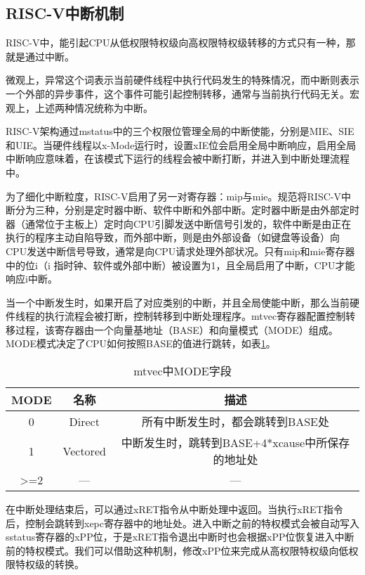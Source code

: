 \subsection{RISC-V中断机制}
\label{sec:interrupt}

RISC-V中，能引起CPU从低权限特权级向高权限特权级转移的方式只有一种，那就是通过中断。

微观上，异常这个词表示当前硬件线程中执行代码发生的特殊情况，而中断则表示一个外部的异步事件，这个事件可能引起控制转移，通常与当前执行代码无关。宏观上，上述两种情况统称为中断。

RISC-V架构通过mstatus中的三个权限位管理全局的中断使能，分别是MIE、SIE和UIE。当硬件线程以x-Mode运行时，设置xIE位会启用全局中断响应，启用全局中断响应意味着，在该模式下运行的线程会被中断打断，并进入到中断处理流程中。

为了细化中断粒度，RISC-V启用了另一对寄存器：mip与mie。规范将RISC-V中断分为三种，分别是定时器中断、软件中断和外部中断。定时器中断是由外部定时器（通常位于主板上）定时向CPU引脚发送中断信号引发的，软件中断是由正在执行的程序主动自陷导致，而外部中断，则是由外部设备（如键盘等设备）向CPU发送中断信号导致，通常是向CPU请求处理外部状况。只有mip和mie寄存器中的位i（i 指时钟、软件或外部中断）被设置为1，且全局启用了中断，CPU才能响应i中断。

当一个中断发生时，如果开启了对应类别的中断，并且全局使能中断，那么当前硬件线程的执行流程会被打断，控制转移到中断处理程序。mtvec寄存器配置控制转移过程，该寄存器由一个向量基地址（BASE）和向量模式（MODE）组成。MODE模式决定了CPU如何按照BASE的值进行跳转，如表\ref{tab:mtvec}。

\begin{table}[h]
	\centering
	\setlength{\belowcaptionskip}{2pt}
	\caption{mtvec中MODE字段}
	\label{tab:mtvec}
	\begin{tabular}{ccc}
		\hline
		MODE             & 名称       & 描述                                        \\ \hline
		0                & Direct   & 所有中断发生时，都会跳转到BASE处                        \\
		1                & Vectored & 中断发生时，跳转到BASE+4*xcause中所保存的地址处 \\
		\textgreater{}=2 & —        & —                                         \\ \hline
	\end{tabular}
\end{table}

在中断处理结束后，可以通过xRET指令从中断处理中返回。当执行xRET指令后，控制会跳转到xepc寄存器中的地址处。进入中断之前的特权模式会被自动写入 sstatus寄存器的xPP位，于是xRET指令退出中断时也会根据xPP位恢复进入中断前的特权模式。我们可以借助这种机制，修改xPP位来完成从高权限特权级向低权限特权级的转换。

